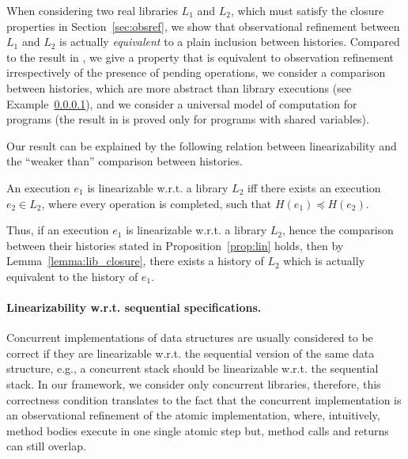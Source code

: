 When considering two real libraries $L_1$ and $L_2$, which must satisfy the closure 
properties in Section~\ref{sec:obsref}, we show that observational refinement between $L_1$ and $L_2$ is actually 
\emph{equivalent} to a plain inclusion between histories. Compared to the
result in \citet{journals/tcs/FilipovicORY10}, we give a property that is equivalent to observation refinement irrespectively of the
presence of pending operations, we consider a comparison between histories, which are more abstract 
than library executions (see Example~\ref{}), and we consider a universal model of computation for programs 
(the result in \citet{journals/tcs/FilipovicORY10} is proved only for programs with shared variables). 

Our result can be explained by the following relation between linearizability and the ``weaker than'' comparison between histories.

\begin{proposition}\label{prop:lin}
An execution $e_1$ is linearizable w.r.t. a library $L_2$ iff there exists an execution $e_2\in L_2$, where every operation is completed, 
such that $H(e_1)\preceq H(e_2)$.
\end{proposition}



Thus, if an execution $e_1$ is linearizable w.r.t. a library $L_2$, hence the comparison between their histories 
stated in Proposition~\ref{prop:lin} holds, then by Lemma~\ref{lemma:lib_closure}, 
there exists a history of $L_2$ which is actually equivalent to the history of $e_1$.


\paragraph{Linearizability w.r.t. sequential specifications.} Concurrent implementations of data structures are usually considered to be correct if they are linearizable w.r.t. the sequential version of the same data structure, e.g., a concurrent stack should be linearizable w.r.t. the sequential stack. In our framework, we consider only concurrent libraries, therefore, this correctness condition translates to the fact that the concurrent implementation is an observational refinement of the atomic implementation, where, intuitively, method bodies execute in one single atomic step but, method calls and returns can still overlap. 


